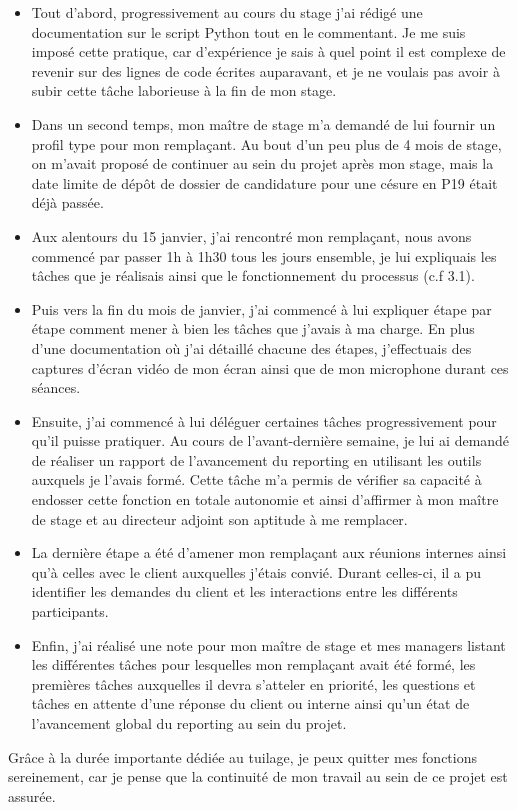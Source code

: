 \begin{itemize}
\item Tout d'abord, progressivement au cours du stage j'ai rédigé une documentation sur le script Python tout en le commentant. Je me suis imposé cette pratique, car d'expérience je sais à quel point il est complexe de revenir sur des lignes de code écrites auparavant, et je ne voulais pas avoir à subir cette tâche laborieuse à la fin de mon stage.
\item Dans un second temps, mon maître de stage m'a demandé de lui fournir un profil type pour mon remplaçant. Au bout d'un peu plus de 4 mois de stage, on m'avait proposé de continuer au sein du projet après mon stage, mais la date limite de dépôt de dossier de candidature pour une césure en P19 était déjà passée.
\item Aux alentours du 15 janvier, j'ai rencontré mon remplaçant, nous avons commencé par passer 1h à 1h30 tous les jours ensemble, je lui expliquais les tâches que je réalisais ainsi que le fonctionnement du processus (c.f 3.1).
\item Puis vers la fin du mois de janvier, j'ai commencé à lui expliquer étape par étape comment mener à bien les tâches que j'avais à ma charge. En plus d'une documentation où j'ai détaillé chacune des étapes, j'effectuais des captures d'écran vidéo de mon écran ainsi que de mon microphone durant ces séances.
\item Ensuite, j'ai commencé à lui déléguer certaines tâches progressivement pour qu'il puisse pratiquer. Au cours de l'avant-dernière semaine, je lui ai demandé de réaliser un rapport de l'avancement du \gls{reporting} en utilisant les outils auxquels je l'avais formé. Cette tâche m'a permis de vérifier sa capacité à endosser cette fonction en totale autonomie et ainsi d'affirmer à mon maître de stage et au directeur adjoint son aptitude à me remplacer.
\item La dernière étape a été d'amener mon remplaçant aux réunions internes ainsi qu'à celles avec le client auxquelles j'étais convié. Durant celles-ci, il a pu identifier les demandes du client et les interactions entre les différents participants.
\item Enfin, j'ai réalisé une note pour mon maître de stage et mes managers listant les différentes tâches pour lesquelles mon remplaçant avait été formé, les premières tâches auxquelles il devra s'atteler en priorité, les questions et tâches en attente d'une réponse du client ou interne ainsi qu'un état de l'avancement global du \gls{reporting} au sein du projet.
\end{itemize}

Grâce à la durée importante dédiée au tuilage, je peux quitter mes fonctions sereinement, car je pense que la continuité de mon travail au sein de ce projet est assurée.
